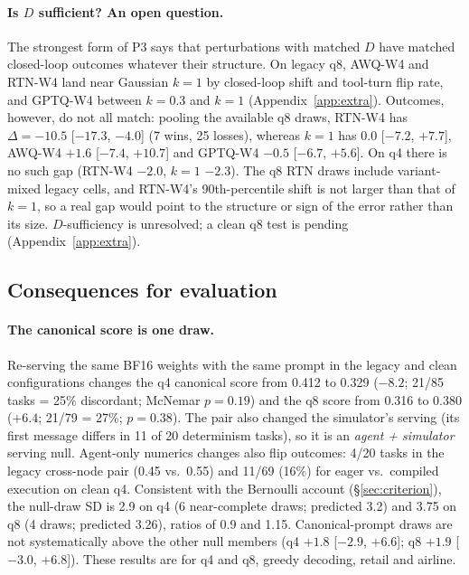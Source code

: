 \paragraph{Is $D$ sufficient? An open question.} The strongest form of P3 says that perturbations with matched $D$ have matched closed-loop outcomes whatever their structure. On legacy q8, AWQ-W4 and RTN-W4 land near Gaussian $k{=}1$ by closed-loop shift and tool-turn flip rate, and GPTQ-W4 between $k{=}0.3$ and $k{=}1$ (Appendix~\ref{app:extra}). Outcomes, however, do not all match: pooling the available q8 draws, RTN-W4 has $\Delta = -10.5$\pp{} [$-17.3$, $-4.0$] (7 wins, 25 losses), whereas $k{=}1$ has 0.0\pp{} [$-7.2$, $+7.7$], AWQ-W4 $+1.6$\pp{} [$-7.4$, $+10.7$] and GPTQ-W4 $-0.5$\pp{} [$-6.7$, $+5.6$]. On q4 there is no such gap (RTN-W4 $-2.0$\pp{}, $k{=}1$ $-2.3$\pp{}). The q8 RTN draws include variant-mixed legacy cells, and RTN-W4's 90th-percentile shift is not larger than that of $k{=}1$, so a real gap would point to the structure or sign of the error rather than its size. $D$-sufficiency is unresolved; a clean q8 test is pending (Appendix~\ref{app:extra}).

\subsection{Consequences for evaluation}
\label{sec:consequences}

\paragraph{The canonical score is one draw.} Re-serving the same BF16 weights with the same prompt in the legacy and clean configurations changes the q4 canonical score from 0.412 to 0.329 ($-8.2$\pp{}; 21/85 tasks = 25\% discordant; McNemar $p = 0.19$) and the q8 score from 0.316 to 0.380 ($+6.4$\pp{}; 21/79 = 27\%; $p = 0.38$). The pair also changed the simulator's serving (its first message differs in 11 of 20 determinism tasks), so it is an \emph{agent + simulator} serving null. Agent-only numerics changes also flip outcomes: 4/20 tasks in the legacy cross-node pair (0.45 vs.\ 0.55) and 11/69 (16\%) for eager vs.\ compiled execution on clean q4. Consistent with the Bernoulli account (\S\ref{sec:criterion}), the null-draw SD is 2.9\pp{} on q4 (6 near-complete draws; predicted 3.2) and 3.75\pp{} on q8 (4 draws; predicted 3.26), ratios of 0.9 and 1.15. Canonical-prompt draws are not systematically above the other null members (q4 $+1.8$\pp{} [$-2.9$, $+6.6$]; q8 $+1.9$\pp{} [$-3.0$, $+6.8$]). These results are for q4 and q8, greedy decoding, \tautwo{} retail and airline.

